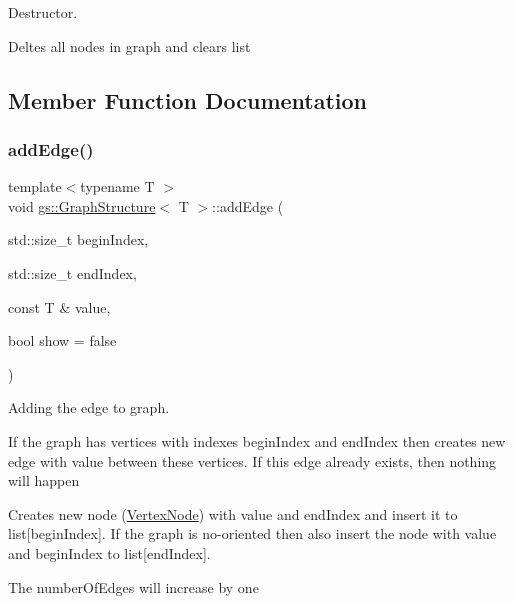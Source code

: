 Destructor. 

Deltes all nodes in graph and clears \textquotesingle{}list\textquotesingle{} 

\subsection{Member Function Documentation}
\mbox{\label{classgs_1_1_graph_structure_af917d0945351f897f5de14d0ea527170}} 
\subsubsection{\texorpdfstring{add\+Edge()}{addEdge()}}
{\footnotesize\ttfamily template$<$typename T $>$ \\
void \mbox{\hyperlink{classgs_1_1_graph_structure}{gs\+::\+Graph\+Structure}}$<$ T $>$\+::add\+Edge (\begin{DoxyParamCaption}\item[{std\+::size\+\_\+t}]{begin\+Index,  }\item[{std\+::size\+\_\+t}]{end\+Index,  }\item[{const T \&}]{value,  }\item[{bool}]{show = {\ttfamily false} }\end{DoxyParamCaption})}



Adding the edge to graph. 

If the graph has vertices with indexes \textquotesingle{}begin\+Index\textquotesingle{} and \textquotesingle{}end\+Index\textquotesingle{} then creates new edge with value between these vertices. If this edge already exists, then nothing will happen

Creates new node (\mbox{\hyperlink{structgs_1_1_vertex_node}{Vertex\+Node}}) with \textquotesingle{}value\textquotesingle{} and \textquotesingle{}end\+Index\textquotesingle{} and insert it to \textquotesingle{}list\mbox{[}begin\+Index\mbox{]}\textquotesingle{}. If the graph is no-\/oriented then also insert the node with \textquotesingle{}value\textquotesingle{} and \textquotesingle{}begin\+Index\textquotesingle{} to \textquotesingle{}list\mbox{[}end\+Index\mbox{]}\textquotesingle{}.

The \textquotesingle{}number\+Of\+Edges\textquotesingle{} will increase by one

